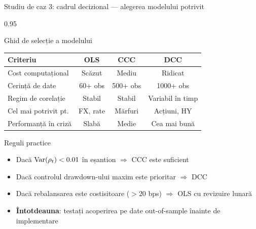 \documentclass[9pt, aspectratio=169, t]{beamer}
\begin{document}
\begin{frame}{Studiu de caz 3: cadrul decizional --- alegerea modelului potrivit}
    \begin{cminipage}{0.95\textwidth}
    {\footnotesize
    \begin{block}{Ghid de selecție a modelului}
        \vspace{0.1cm}
        {\small
        \begin{center}
        \begin{tabular}{l|c|c|c}
            \hline
            \textbf{Criteriu} & \textbf{OLS} & \textbf{CCC} & \textbf{DCC} \\
            \hline
            Cost computațional   & Scăzut & Mediu  & Ridicat \\
            Cerință de date      & 60+ obs & 500+ obs & 1000+ obs \\
            Regim de corelație   & Stabil & Stabil & Variabil în timp \\
            Cel mai potrivit pt. & FX, rate & Mărfuri & Acțiuni, HY \\
            Performanță în criză & Slabă  & Medie  & Cea mai bună \\
            \hline
        \end{tabular}
        \end{center}
        }
    \end{block}
    \begin{alertblock}{Reguli practice}
        \begin{itemize}\setlength{\itemsep}{0pt}
            \item Dacă $\text{Var}(\rho_t) < 0.01$ în eșantion $\Rightarrow$ CCC este suficient
            \item Dacă controlul drawdown-ului maxim este prioritar $\Rightarrow$ DCC
            \item Dacă rebalansarea este costisitoare ($> 20$ bps) $\Rightarrow$ OLS cu revizuire lunară
            \item \textbf{Întotdeauna}: testați acoperirea pe date out-of-sample înainte de implementare
        \end{itemize}
    \end{alertblock}
    }
    \end{cminipage}
\end{frame}
\end{document}
